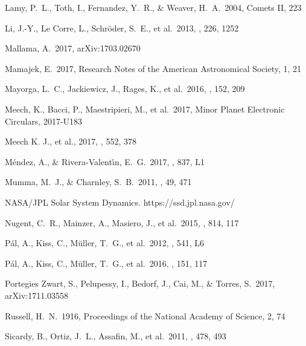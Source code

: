 \documentclass[a4paper,fleqn,usenatbib]{mnras}
\begin{document}
\begin{thebibliography}{99}
 Lamy, P.~L., Toth, I., Fernandez, Y.~R., \& Weaver, H.~A.\ 2004, Comets II, 223 

 Li, J.-Y., Le Corre, L., Schr{\"o}der, S.~E., et al.\ 2013, \icarus, 226, 1252 

 Mallama, A.\ 2017, arXiv:1703.02670 

 Mamajek, E.\ 2017, Research Notes of the American Astronomical Society, 1, 21 

 Mayorga, L.~C., Jackiewicz, J., Rages, K., et al.\ 2016, \aj, 152, 209 

 Meech, K., Bacci, P., Maestripieri, M., et al.\ 2017, Minor Planet Electronic Circulars, 2017-U183

 Meech K. J., et al., 2017, \nat, 552, 378

 M{\'e}ndez, A., \& Rivera-Valent{\'{\i}}n, E.~G.\ 2017, \apjl, 837, L1 

 Mumma, M.~J., \& Charnley, S.~B.\ 2011, \araa, 49, 471 

 NASA/JPL Solar System Dynamics. https://ssd.jpl.nasa.gov/

 Nugent, C.~R., Mainzer, A., Masiero, J., et al.\ 2015, \apj, 814, 117 

 P{\'a}l, A., Kiss, C., M{\"u}ller, T.~G., et al.\ 2012, \aap, 541, L6 

 P{\'a}l, A., Kiss, C., M{\"u}ller, T.~G., et al.\ 2016, \aj, 151, 117 

 Portegies Zwart, S., Pelupessy, I., Bedorf, J., Cai, M., \& Torres, S.\ 2017, arXiv:1711.03558

 Russell, H.~N.\ 1916, Proceedings of the National Academy of Science, 2, 74 

 Sicardy, B., Ortiz, J.~L., Assafin, M., et al.\ 2011, \nat, 478, 493 


\end{thebibliography}
\end{document}

